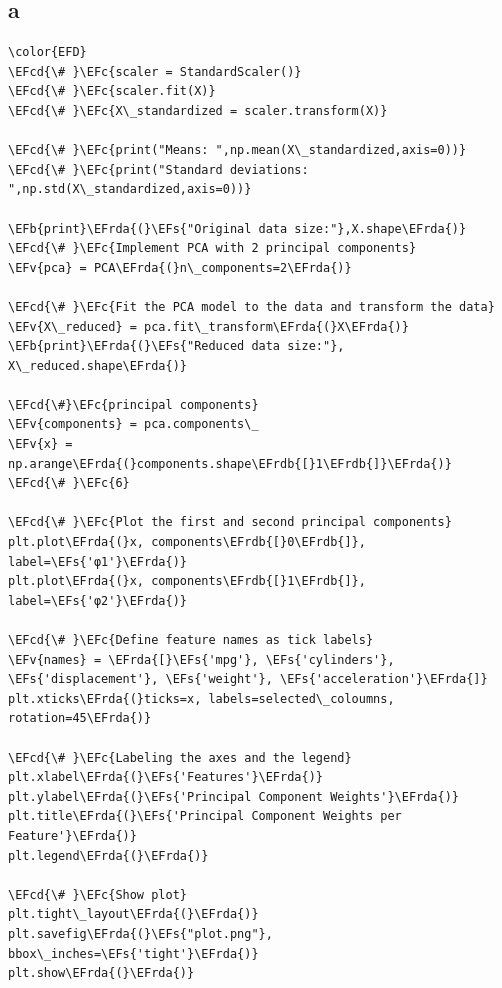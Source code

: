 \documentclass[11pt]{article}
\newcommand{\EFc}[1]{\textcolor{EFc}{#1}} %
\newcommand{\EFcd}[1]{\textcolor{EFcd}{#1}} %
\newcommand{\EFs}[1]{\textcolor{EFs}{#1}} %
\newcommand{\EFb}[1]{\textcolor{EFb}{#1}} %
\newcommand{\EFv}[1]{\textcolor{EFv}{#1}} %
\newcommand{\EFrda}[1]{\textcolor{EFrda}{#1}} %
\newcommand{\EFrdb}[1]{\textcolor{EFrdb}{#1}} %
\begin{document}
\subsection*{a}
\label{sec:orgbe84ed0}
\begin{Code}
\begin{Verbatim}
\color{EFD}
\EFcd{\# }\EFc{scaler = StandardScaler()}
\EFcd{\# }\EFc{scaler.fit(X)}
\EFcd{\# }\EFc{X\_standardized = scaler.transform(X)}

\EFcd{\# }\EFc{print("Means: ",np.mean(X\_standardized,axis=0))}
\EFcd{\# }\EFc{print("Standard deviations: ",np.std(X\_standardized,axis=0))}

\EFb{print}\EFrda{(}\EFs{"Original data size:"},X.shape\EFrda{)}
\EFcd{\# }\EFc{Implement PCA with 2 principal components}
\EFv{pca} = PCA\EFrda{(}n\_components=2\EFrda{)}

\EFcd{\# }\EFc{Fit the PCA model to the data and transform the data}
\EFv{X\_reduced} = pca.fit\_transform\EFrda{(}X\EFrda{)}
\EFb{print}\EFrda{(}\EFs{"Reduced data size:"}, X\_reduced.shape\EFrda{)}

\EFcd{\#}\EFc{principal components}
\EFv{components} = pca.components\_
\EFv{x} = np.arange\EFrda{(}components.shape\EFrdb{[}1\EFrdb{]}\EFrda{)} \EFcd{\# }\EFc{6}

\EFcd{\# }\EFc{Plot the first and second principal components}
plt.plot\EFrda{(}x, components\EFrdb{[}0\EFrdb{]}, label=\EFs{'φ1'}\EFrda{)}
plt.plot\EFrda{(}x, components\EFrdb{[}1\EFrdb{]}, label=\EFs{'φ2'}\EFrda{)}

\EFcd{\# }\EFc{Define feature names as tick labels}
\EFv{names} = \EFrda{[}\EFs{'mpg'}, \EFs{'cylinders'}, \EFs{'displacement'}, \EFs{'weight'}, \EFs{'acceleration'}\EFrda{]}
plt.xticks\EFrda{(}ticks=x, labels=selected\_coloumns, rotation=45\EFrda{)}

\EFcd{\# }\EFc{Labeling the axes and the legend}
plt.xlabel\EFrda{(}\EFs{'Features'}\EFrda{)}
plt.ylabel\EFrda{(}\EFs{'Principal Component Weights'}\EFrda{)}
plt.title\EFrda{(}\EFs{'Principal Component Weights per Feature'}\EFrda{)}
plt.legend\EFrda{(}\EFrda{)}

\EFcd{\# }\EFc{Show plot}
plt.tight\_layout\EFrda{(}\EFrda{)}
plt.savefig\EFrda{(}\EFs{"plot.png"}, bbox\_inches=\EFs{'tight'}\EFrda{)}
plt.show\EFrda{(}\EFrda{)}
\end{Verbatim}
\end{Code}
\end{document}
